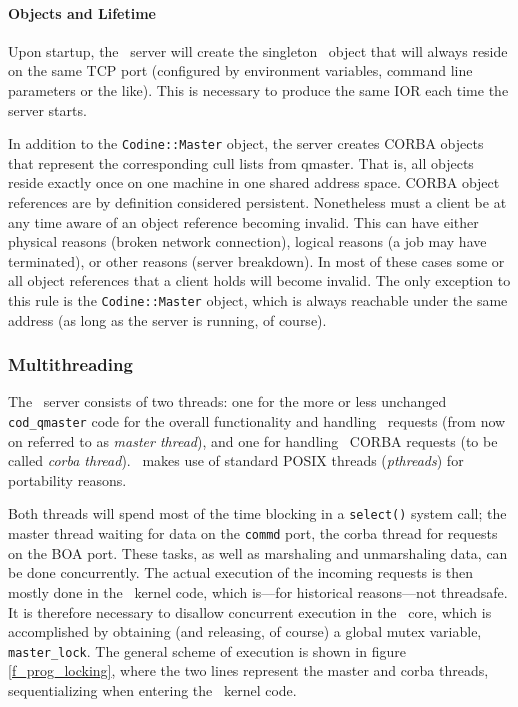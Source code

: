 \paragraph{Objects and Lifetime}
  Upon startup, the \qidl\ server will
  create the singleton \master\ object that will always reside on the same
  TCP port (configured by environment variables, command line parameters
  or the like). This is necessary to produce the same IOR each time the 
  server starts.

  In addition to the {\tt Codine::Master} object, the server creates CORBA
  objects that represent the corresponding cull lists from qmaster. That is, all
  objects reside exactly once on one machine in one shared address space. 
  CORBA object references are by definition considered
  persistent. Nonetheless must a client be at any time aware of an object
  reference becoming invalid. This can have either physical reasons (broken
  network connection), logical reasons (a job may have terminated), or
  other reasons (server breakdown). In most of these cases some or all
  object references that a client holds will become invalid. The only
  exception to
  this rule is the {\tt Codine::Master} object, which is always reachable
  under the same address (as long as the server is running, of course).

\subsubsection{Multithreading}
The \qidl\ server consists of two threads: one for the more or less unchanged
\texttt{cod\_qmaster} code for the overall functionality and handling \codapi\
requests (from now on referred to as \emph{master thread}), and one for 
handling \qidl\ CORBA requests (to be called \emph{corba thread}). \qidl\ 
makes use of standard POSIX threads (\textsl{pthreads}) for portability reasons.

Both threads will spend most of the time blocking in a 
\texttt{select()} system call; the master thread waiting for data on the
\texttt{commd} port, the corba thread for requests on the BOA port.
These tasks, as well as marshaling and unmarshaling data, can be done
concurrently. The actual execution of the incoming requests is then mostly
done in the \codine\ kernel code, which is---for historical reasons---not
threadsafe. It is therefore necessary to disallow concurrent execution in the
\codine\ core, which is accomplished by obtaining (and releasing, of course) 
a global mutex variable, \texttt{master\_lock}. The general scheme of
execution is shown in figure \ref{f_prog_locking}, where the two lines
represent the master and corba threads, sequentializing when entering the
\codine\ kernel code.

